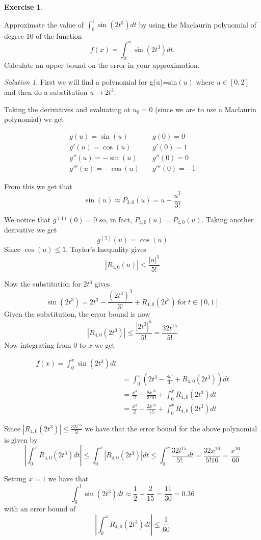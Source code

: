 \documentclass[
]{book}
\theoremstyle{definition}
\theoremstyle{definition}
\theoremstyle{definition}
\newtheorem{exercise}{Exercise}[chapter]
\theoremstyle{definition}
\theoremstyle{remark}
\newtheorem*{solution}{Solution}
\begin{document}
\begin{exercise}
\protect\hypertarget{exr:unlabeled-div-273}{}\label{exr:unlabeled-div-273}

Approximate the value of \(\int_0^1 \sin(2t^3)dt\) by using the Maclaurin polynomial of degree \(10\) of the function
\[
    f(x) = \int_0^x \sin(2t^3) dt.
\]
Calculate an upper bound on the error in your approximation.

\end{exercise}

\begin{solution}

First we will find a polynomial for g(u)=sin\((u)\) where \(u\in [0,2]\) and then do a substitution \(u\rightarrow 2t^3\).

Taking the derivatives and evaluating at \(u_0=0\) (since we are to use a Maclaurin polynomial) we get

\begin{align*}
g(u)=\sin (u) & \quad g(0)=0\\
g'(u)=\cos (u) & \quad g'(0)= 1\\
g''(u)=-\sin (u) & \quad g''(0)=0\\
g'''(u)=-\cos (u) & \quad g'''(0)=-1
\end{align*}

From this we get that
\[ \sin (u)\approx P_{3,0}(u)=u-\frac{u^3}{3!}\]

We notice that \(g^{(4)}(0)=0\) so, in fact, \(P_{3,0}(u)=P_{4,0}(u)\). Taking another derivative we get
\[g^{(5)}(u)=\cos (u)\]
Since \(\cos(u)\leq 1\), Taylor's Inequality gives
\[|R_{4,0}(u)|\leq \frac{|u|^5}{5!}\]

Now the substitution for \(2t^3\) gives
\[\sin (2t^3)=2t^3-\frac{(2t^3)^3}{3!}+R_{4,0}(2t^3) \ \mathrm{for} \ t\in[0,1]\]
Given the substitution, the error bound is now
\[|R_{4,0}(2t^3)|\leq \frac{|2t^3|^5}{5!}=\frac{32t^{15}}{5!}\]
Now integrating from \(0\) to \(x\) we get

\begin{align*}
f(x)=\int^x_0\sin (2t^3)dt\\
&=\int^x_0(2t^3-\frac{8t^9}{3!}+R_{4,0}(2t^3))dt\\
&=\frac{x^4}{2}-\frac{8x^{10}}{3!10}+\int^x_0R_{4,0}(2t^3)dt\\
&=\frac{x^4}{2}-\frac{2x^{10}}{15}+\int^x_0R_{4,0}(2t^3)dt
\end{align*}

Since \(|R_{4,0}(2t^3)|\leq \frac{32t^{15}}{5!}\) we have that the error bound for the above polynomial is given by
\[\left|\int^x_0R_{4,0}(2t^3)dt\right|\leq \int^x_0|R_{4,0}(2t^3)|dt \leq \int^x_0 \frac{32t^{15}}{5!}dt=\frac{32x^{16}}{5!16}=\frac{x^{16}}{60}\]

Setting \(x=1\) we have that
\[\int^1_0\sin (2t^3)dt \approx \frac{1}{2}-\frac{2}{15}=\frac{11}{30}=0.3\overline{6}\]
with an error bound of
\[\left|\int^x_0R_{4,0}(2t^3)dt\right|\leq \frac{1}{60}\]

\end{solution}
\end{document}
